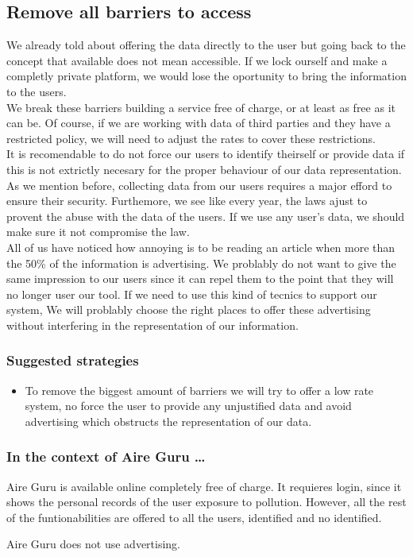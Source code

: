 \subsection{Remove all barriers to access}
We already told about offering the data directly to the user but going back to the concept that available
does not mean accessible. If we lock ourself and make a completly private platform, we would lose the oportunity
to bring the information to the users.\\

We break these barriers building a service free of charge, or at least as free as it can be. Of course, if we are 
working with data of third parties and they have a restricted policy, we will need to adjust the rates to cover
these restrictions.\\

It is recomendable to do not force our users to identify theirself or provide data if this is not
extrictly necesary for the proper behaviour of our data representation. As we mention before, collecting data from our
users requires a major efford to ensure their security. Furthemore, we see like every year, the laws ajust to provent
the abuse with the data of the users. If we use any user's data, we should make sure it not compromise the law.\\

All of us have noticed how annoying is to be reading an article when more than the 50\% of the information is advertising.
We problably do not want to give the same impression to our users since it can repel them to the point that they will no longer
user our tool. If we need to use this kind of tecnics to support our system, We will problably choose the right places to offer 
these advertising without interfering in the representation of our information.


\subsubsection*{Suggested strategies} 

\begin{itemize}
    \item To remove the biggest amount of barriers we will try to offer a low rate system, no force the user to provide any unjustified 
    data and avoid advertising which obstructs the representation of our data.
\end{itemize}

\subsubsection*{In the context of Aire Guru \ldots} 

Aire Guru is available online completely free of charge. It requieres login, since it shows the personal records of the 
user exposure to pollution. However, all the rest of the funtionabilities are offered to all the users, identified and no 
identified.

Aire Guru does not use advertising.